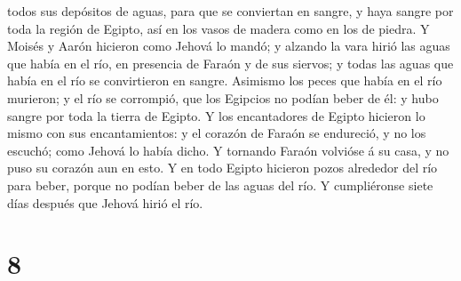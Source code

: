 todos sus depósitos de aguas, para que se conviertan en sangre, y haya
sangre por toda la región de Egipto, así en los vasos de madera como en
los de piedra.  Y Moisés y Aarón hicieron como Jehová lo
mandó; y alzando la vara hirió las aguas que había en el río, en
presencia de Faraón y de sus siervos; y todas las aguas que había en el
río se convirtieron en sangre.  Asimismo los peces que
había en el río murieron; y el río se corrompió, que los Egipcios no
podían beber de él: y hubo sangre por toda la tierra de Egipto.
 Y los encantadores de Egipto hicieron lo mismo con sus
encantamientos: y el corazón de Faraón se endureció, y no los escuchó;
como Jehová lo había dicho.  Y tornando Faraón volvióse á
su casa, y no puso su corazón aun en esto.  Y en todo
Egipto hicieron pozos alrededor del río para beber, porque no podían
beber de las aguas del río.  Y cumpliéronse siete días
después que Jehová hirió el río.

\hypertarget{section-7}{%
\section{8}\label{section-7}}

